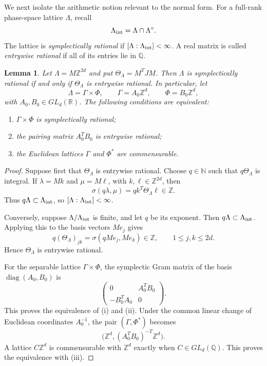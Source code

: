 \documentclass[11pt,reqno]{amsart}
\numberwithin{equation}{section}
\newtheorem*{unnumberedlemma}{Lemma}
\theoremstyle{definition}
\theoremstyle{remark}
\newcommand{\R}{\mathbb R}
\newcommand{\Z}{\mathbb Z}
\newcommand{\N}{\mathbb N}
\newcommand{\Q}{\mathbb Q}
\begin{document}
We next isolate the arithmetic notion relevant to the normal form.  For a
full-rank phase-space lattice $\Lambda$, recall
\[
 \Lambda_{\rm int}=\Lambda\cap\Lambda^\circ.
\]
The lattice is \emph{symplectically rational} if
$[\Lambda:\Lambda_{\rm int}]<\infty$.  A real matrix is called
\emph{entrywise rational} if all of its entries lie in $\Q$.

\begin{unnumberedlemma}
Let $\Lambda=M\Z^{2d}$ and put
$\Theta_\Lambda=M^TJM$.  Then $\Lambda$ is symplectically rational if and
only if $\Theta_\Lambda$ is entrywise rational.  In particular, let
\[
 \Lambda=\Gamma\times\Phi,
 \qquad
 \Gamma=A_0\Z^d,
 \qquad
 \Phi=B_0\Z^d,
\]
with $A_0,B_0\in GL_d(\R)$.  The following conditions are equivalent:
\begin{enumerate}[label=\textup{(\roman*)}]
\item $\Gamma\times\Phi$ is symplectically rational;
\item the pairing matrix $A_0^TB_0$ is entrywise rational;
\item the Euclidean lattices $\Gamma$ and $\Phi^*$ are commensurable.
\end{enumerate}
\end{unnumberedlemma}

\begin{proof}
Suppose first that $\Theta_\Lambda$ is entrywise rational.  Choose
$q\in\N$ such that $q\Theta_\Lambda$ is integral.  If
$\lambda=Mk$ and $\mu=M\ell$, with $k,\ell\in\Z^{2d}$, then
\[
 \sigma(q\lambda,\mu)=qk^T\Theta_\Lambda\ell\in\Z.
\]
Thus $q\Lambda\subset\Lambda_{\rm int}$, so
$[\Lambda:\Lambda_{\rm int}]<\infty$.

Conversely, suppose $\Lambda/\Lambda_{\rm int}$ is finite, and let $q$ be
its exponent.  Then $q\Lambda\subset\Lambda_{\rm int}$.  Applying this to
the basis vectors $Me_j$ gives
\[
 q(\Theta_\Lambda)_{jk}
 =\sigma(qMe_j,Me_k)\in\Z,
 \qquad 1\le j,k\le2d.
\]
Hence $\Theta_\Lambda$ is entrywise rational.

For the separable lattice $\Gamma\times\Phi$, the symplectic Gram matrix of
the basis $\operatorname{diag}(A_0,B_0)$ is
\[
 \begin{pmatrix}
 0&A_0^TB_0\\
 -B_0^TA_0&0
 \end{pmatrix}.
\]
This proves the equivalence of (i) and (ii).  Under the common linear change
of Euclidean coordinates $A_0^{-1}$, the pair $(\Gamma,\Phi^*)$ becomes
\[
 \bigl(\Z^d,(A_0^TB_0)^{-T}\Z^d\bigr).
\]
A lattice $C\Z^d$ is commensurable with $\Z^d$ exactly when
$C\in GL_d(\Q)$.  This proves the equivalence with (iii).
\end{proof}
\end{document}
